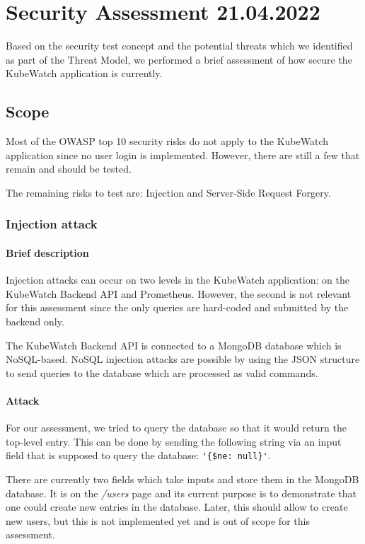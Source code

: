\chapter{Security Assessment 21.04.2022}

Based on the security test concept and the potential threats which we identified as part of the Threat Model, we performed a brief assessment of how secure the KubeWatch application is currently.

\section{Scope}

Most of the OWASP top 10 security risks do not apply to the KubeWatch application since no user login is implemented. However, there are still a few that remain and should be tested.

The remaining risks to test are: Injection and Server-Side Request Forgery. 

\subsection{Injection attack}
\subsubsection{Brief description}
Injection attacks can occur on two levels in the KubeWatch application: on the KubeWatch Backend API and Prometheus. However, the second is not relevant for this assessment since the only queries are hard-coded and submitted by the backend only.

The KubeWatch Backend API is connected to a MongoDB database which is NoSQL-based. NoSQL injection attacks are possible by using the JSON structure to send queries to the database which are processed as valid commands.

\subsubsection{Attack}
For our assessment, we tried to query the database so that it would return the top-level entry. This can be done by sending the following string via an input field that is supposed to query the database: \lstinline "'{$ne: null}'".

There are currently two fields which take inputs and store them in the MongoDB database. It is on the \textit{/users} page and its current purpose is to demonstrate that one could create new entries in the database. Later, this should allow to create new users, but this is not implemented yet and is out of scope for this assessment.

